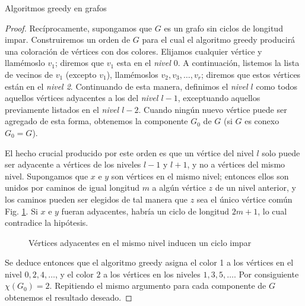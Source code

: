 \begin{section}{Algoritmos greedy en grafos}
\begin{proof}
Recíprocamente, supongamos que $G$ es un grafo sin ciclos de longitud impar. Construiremos un orden de $G$ para el cual el algoritmo greedy producirá una coloración de vértices con dos colores. Elijamos cualquier vértice y llamémoslo $v_1$; diremos que $v_1$ esta en el \textit{nivel $0$}. A continuación, listemos la
lista de vecinos de $v_1$ (excepto $v_1$), llamémoslos $v_2,v_3,\dots,v_r$; diremos que estos vértices están en el \textit{nivel 2}. Continuando de esta manera, definimos el \textit{nivel $l$} como todos aquellos vértices adyacentes a los del \textit{nivel $l-1$}, exceptuando aquellos previamente listados en el \textit{nivel
$l-2$}. Cuando ningún nuevo vértice puede ser agregado de esta forma, obtenemos la componente $G_0$ de $G$ (si $G$ es conexo $G_0=G$).

El hecho crucial producido por este orden es que un vértice del nivel $l$ solo puede ser adyacente a vértices de los niveles $l-1$ y $l+1$, y no a vértices del mismo nivel. Supongamos que $x$ e $y$ son vértices en el mismo nivel; entonces ellos son unidos por caminos de igual longitud $m$ a algún vértice $z$ de un nivel anterior, y los caminos pueden ser elegidos de tal manera que $z$ sea el único vértice común Fig. \ref{f5.13}. Si $x$ e $y$ fueran adyacentes, habría un ciclo de longitud $2m+1$, lo cual contradice
la hipótesis. 

\begin{figure}[ht]
    \begin{center}
    \end{center}
    \caption{Vértices adyacentes en el mismo nivel inducen un ciclo impar} \label{f5.13}
\end{figure}

Se deduce entonces que el algoritmo greedy asigna el color 1 a los vértices en el nivel $0,2,4,\ldots$, y el color $2$ a los vértices en los niveles $1,3,5,\ldots$. Por consiguiente $\chi(G_0)=2$. Repitiendo el mismo argumento para cada componente de $G$ obtenemos el resultado deseado.
\end{proof}


\end{section}
